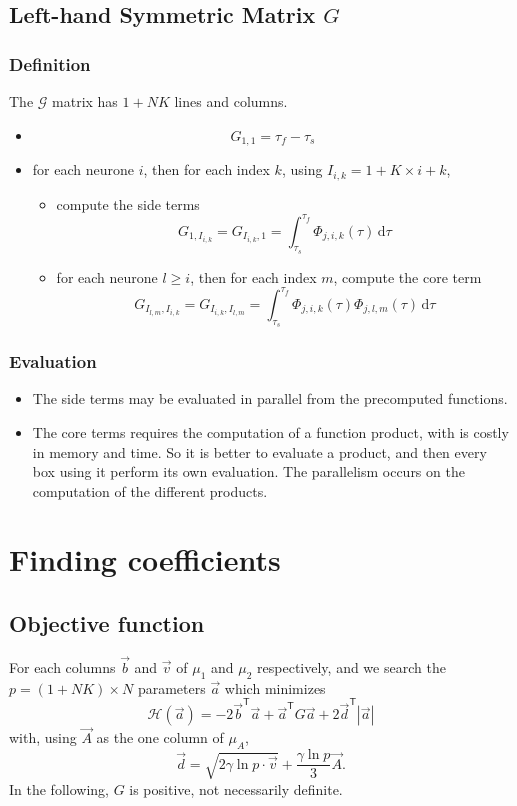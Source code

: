 \documentclass{revtex4}
\newcommand{\abs}[1]{\left|#1\right|}
\newcommand{\trn}[1]{{#1}^{\mathsf{T}}}
\begin{document}
\subsection{Left-hand Symmetric Matrix ${G}$}
\subsubsection{Definition}
The $\mathcal{G}$ matrix has $1+NK$ lines and columns.
\begin{itemize}
	\item 
		$$ 
		{G}_{1,1} = \tau_f-\tau_s
		$$
	\item for each neurone $i$, then for each index $k$, using $I_{i,k}=1+K\times i + k$,
		\begin{itemize}
		\item compute the side terms
		$$
			{G}_{1,I_{i,k}} = {G}_{I_{i,k},1} = \int_{\tau_s}^{\tau_f} \Phi_{j,i,k}(\tau) \, \mathrm{d}\tau
		$$
		\item for each neurone $l\geq i$, then for each index $m$, compute the core term
		$$
			{G}_{I_{l,m},I_{i,k}} = {G}_{I_{i,k},I_{l,m}}  =
			\int_{\tau_s}^{\tau_f}  \Phi_{j,i,k}(\tau) \Phi_{j,l,m}(\tau) \, \mathrm{d}\tau
		$$
		\end{itemize}
\end{itemize}

\subsubsection{Evaluation}
\begin{itemize}
\item The side terms may be evaluated in parallel from the precomputed functions.

\item The core terms requires the computation of a function product, with is costly
in memory and time. So it is better to evaluate a product, and then 
every box using it perform its own evaluation.
 The parallelism occurs
on the computation of the different products.
\end{itemize}

\section{Finding coefficients}
\subsection{Objective function}
For each columns $\vec{b}$ and $\vec{v}$ of $\mu_1$ and $\mu_2$ respectively, and we search the $p=(1+NK) \times N$ parameters $\vec{a}$ which minimizes
\begin{equation}
	\mathcal{H}\left(\vec{a}\right) = -2\trn{\vec{b}}\vec{a} + \trn{\vec{a}} G \vec{a} +2 \trn{\vec{d}} \abs{\vec{a}}
\end{equation}
with, using $\vec{A}$ as the one column of $\mu_A$, 
\begin{equation}
	\vec{d} = \sqrt{2\gamma \ln p \cdot \vec{v}} + \dfrac{\gamma\ln p}{3} \vec{A}. 
\end{equation}
In the following, $G$ is positive, not necessarily definite.
\end{document}
